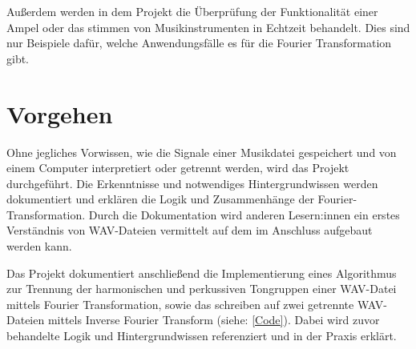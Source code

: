 \par

Außerdem werden in dem Projekt die Überprüfung der Funktionalität einer Ampel oder das stimmen von Musikinstrumenten in Echtzeit behandelt. Dies sind nur Beispiele dafür, welche Anwendungsfälle es für die Fourier Transformation gibt.

%
\section{Vorgehen}
%

Ohne jegliches Vorwissen, wie die Signale einer Musikdatei gespeichert und von einem Computer interpretiert oder getrennt werden, wird das Projekt durchgeführt. Die Erkenntnisse und notwendiges Hintergrundwissen werden dokumentiert und erklären die Logik und Zusammenhänge der Fourier-Transformation. Durch die Dokumentation wird anderen Lesern:innen ein erstes Verständnis von WAV-Dateien vermittelt auf dem im Anschluss aufgebaut werden kann.

\par

Das Projekt dokumentiert anschließend die Implementierung eines Algorithmus zur Trennung der harmonischen und perkussiven Tongruppen einer WAV-Datei mittels Fourier Transformation, sowie das schreiben auf zwei getrennte WAV-Dateien mittels Inverse Fourier Transform (siehe: \cref{Code}). Dabei wird zuvor behandelte Logik und Hintergrundwissen referenziert und in der Praxis erklärt.